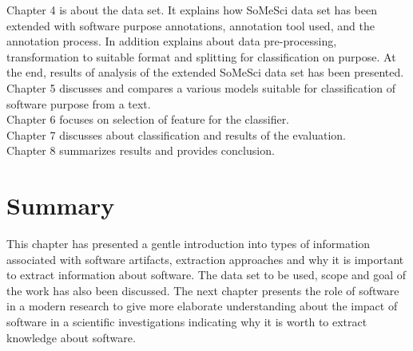 Chapter 4 is about the data set.  It explains how SoMeSci data set has been extended with software purpose annotations, annotation tool used, and the annotation process. In addition explains about data pre-processing, transformation to suitable format and splitting for classification on purpose. At the end, results of analysis of the extended SoMeSci data set has been presented. \\

Chapter 5 discusses and compares a various models suitable for  classification of software purpose from a text. \\

Chapter 6 focuses on selection of feature for the classifier. \\

Chapter 7 discusses about classification and results  of the evaluation. \\

Chapter 8 summarizes results and provides conclusion.


\section{Summary}
\label{sec:intro:Summary}

This chapter has presented a gentle introduction into types of information associated with software artifacts, extraction approaches and why it is important to extract information about software. The data set to be used, scope and goal of the work has also been discussed. 
The next chapter presents the role of software in a modern research to give more elaborate understanding about the impact of software in a scientific investigations indicating why it is worth to extract knowledge about software.  

\clearpage
